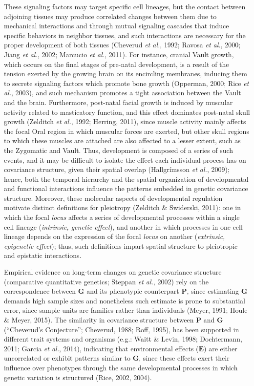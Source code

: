 \documentclass[12pt,twoside]{report}
\begin{document}
These signaling factors may target specific cell lineages, but the
contact between adjoining tissues may produce correlated changes between
them due to mechanical interactions and through mutual signaling
cascades that induce specific behaviors in neighbor tissues, and such
interactions are necessary for the proper development of both tissues
(Cheverud \emph{et al.}, 1992; Ravosa \emph{et al.}, 2000; Jiang
\emph{et al.}, 2002; Marcucio \emph{et al.}, 2011). For instance,
cranial Vault growth, which occurs on the final stages of pre-natal
development, is a result of the tension exerted by the growing brain on
its encircling membranes, inducing them to secrete signaling factors
which promote bone growth (Opperman, 2000; Rice \emph{et al.}, 2003),
and such mechanism promotes a tight association between the Vault and
the brain. Furthermore, post-natal facial growth is induced by muscular
activity related to masticatory function, and this effect dominates
post-natal skull growth (Zelditch \emph{et al.}, 1992; Herring, 2011),
since muscle activity mainly affects the focal Oral region in which
muscular forces are exerted, but other skull regions to which these
muscles are attached are also affected to a lesser extent, such as the
Zygomatic and Vault. Thus, development is composed of a series of such
events, and it may be difficult to isolate the effect each individual
process has on covariance structure, given their spatial overlap
(Hallgrímsson \emph{et al.}, 2009); hence, both the temporal hierarchy
and the spatial organization of developmental and functional
interactions influence the patterns embedded in genetic covariance
structure. Moreover, these molecular aspects of developmental regulation
motivate distinct definitions for pleiotropy (Zelditch \& Swiderski,
2011): one in which the focal \emph{locus} affects a series of
developmental processes within a single cell lineage (\emph{intrinsic,
genetic effect}), and another in which processes in one cell lineage
depends on the expression of the focal \emph{locus} on another
(\emph{extrinsic, epigenetic effect}); thus, such definitions impart
spatial structure to pleiotropic and epistatic interactions.

Empirical evidence on long-term changes on genetic covariance structure
(comparative quantitative genetics; Steppan \emph{et al.}, 2002) rely on
the correspondence between $\mathbf{G}$ and its phenotypic counterpart
$\mathbf{P}$, since estimating $\mathbf{G}$ demands high sample sizes
and nonetheless such estimate is prone to substantial error, since
sample units are families rather than individuals (Meyer, 1991; Houle \&
Meyer, 2015). The similarity in covariance structure between
$\mathbf{P}$ and $\mathbf{G}$ (``Cheverud's Conjecture''; Cheverud,
1988; Roff, 1995), has been supported in different trait systems and
organisms (e.g.: Waitt \& Levin, 1998; Dochtermann, 2011; Garcia
\emph{et al.}, 2014), indicating that environmental effects
($\mathbf{E}$) are either uncorrelated or exhibit patterns similar to
$\mathbf{G}$, since these effects exert their influence over phenotypes
through the same developmental processes in which genetic variation is
structured (Rice, 2002, 2004).
\end{document}
